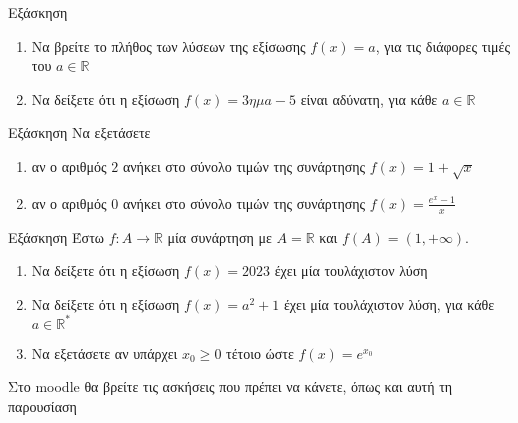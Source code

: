 \documentclass[greek]{beamer}
\begin{document}
\begin{frame}{Εξάσκηση}
 \href{https://www.geogebra.org/m/dvzdm7bw}{}
 \begin{enumerate}
  \item<1-> Να βρείτε το πλήθος των λύσεων της εξίσωσης $f(x)=a$, για τις διάφορες τιμές του $a\in\mathbb{R}$
  \item<2-> Να δείξετε ότι η εξίσωση $f(x)=3ημ a - 5$ είναι αδύνατη, για κάθε $a\in\mathbb{R}$
 \end{enumerate}
\end{frame}

\begin{frame}{Εξάσκηση}
Να εξετάσετε
 \begin{enumerate}
  \item<1-> αν ο αριθμός $2$ ανήκει στο σύνολο τιμών της συνάρτησης $f(x)=1+\sqrt{x}$
  \item<2-> αν ο αριθμός $0$ ανήκει στο σύνολο τιμών της συνάρτησης $f(x)=\frac{e^x-1}{x}$
 \end{enumerate}
\end{frame}

\begin{frame}{Εξάσκηση}
Έστω $f:A\to\mathbb{R}$ μία συνάρτηση με $A=\mathbb{R}$ και $f(A)=(1,+\infty)$.
 \begin{enumerate}
  \item<1-> Να δείξετε ότι η εξίσωση $f(x)=2023$ έχει μία τουλάχιστον λύση
  \item<2-> Να δείξετε ότι η εξίσωση $f(x)=a^2+1$ έχει μία τουλάχιστον λύση, για κάθε $a\in\mathbb{R^*}$
  \item<3-> Να εξετάσετε αν υπάρχει $x_0\ge 0$ τέτοιο ώστε $f(x)=e^{x_0}$
 \end{enumerate}
\end{frame}

\begin{frame}
 Στο moodle θα βρείτε τις ασκήσεις που πρέπει να κάνετε, όπως και αυτή τη παρουσίαση
\end{frame}
\end{document}
